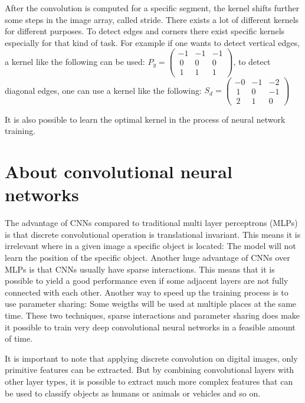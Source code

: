 After the convolution is computed for a specific segment, the kernel shifts further some steps in the image array, called stride. There exists a lot of different kernels for different purposes. To detect edges and corners there exist specific kernels especially for that kind of task. For example if one wants to detect vertical edges, a kernel like the following can be used:
$P_y = \begin{pmatrix}-1 & -1 & -1 \\\ 0 & 0 & 0 \\\ 1 & 1 & 1\end{pmatrix}$, \vspace{0.5cm} to detect diagonal edges, one can use a kernel like the following:
$S_d = \begin{pmatrix}-0 & -1 & -2 \\\ 1 & 0 & -1 \\\ 2 & 1 & 0\end{pmatrix}$ \vspace{0.5cm}

It is also possible to learn the optimal kernel in the process of neural network training.

\section{About convolutional neural networks}

The advantage of CNNs compared to traditional multi layer perceptrons (MLPs) is that discrete convolutional operation is translational invariant. This means it is irrelevant where in a given image a specific object is located: The model will not learn the position of the specific object. Another huge advantage of CNNs over MLPs is that CNNs usually have sparse interactions. This means that it is possible to yield a good performance even if some adjacent layers are not fully connected with each other. Another way to speed up the training process is to use parameter sharing: Some weigths will be used at multiple places at the same time. These two techniques, sparse interactions and parameter sharing does make it possible to train very deep convolutional neural networks in a feasible amount of time.

It is important to note that applying discrete convolution on digital images, only primitive features can be extracted. But by combining convolutional layers with other layer types, it is possible to extract much more complex features that can be used to classify objects as humans or animals or vehicles and so on.

